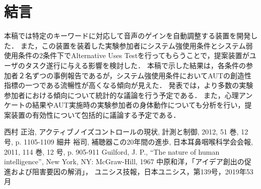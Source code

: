 \documentclass[a4paper]{jarticle}
\begin{document}
\section{結言}
本稿では特定のキーワードに対応して音声のゲインを自動調整する装置を開発した．
また，この装置を装着した実験参加者にシステム強使用条件とシステム弱使用条件の2条件下でAlternative Uses Testを行ってもらうことで，提案装置がユーザのタスク遂行に与える影響を検討した．
本稿で示した結果は，各条件の参加者２名ずつの事例報告であるが，システム強使用条件においてAUTの創造性指標の一つである流暢性が高くなる傾向が見えた．
発表では，より多数の実験参加者における傾向について統計的な議論を行う予定である．
また，心理アンケートの結果やAUT実施時の実験参加者の身体動作についても分析を行い，提案装置の有効性について包括的に議論する予定である．
%
%
\begin{thebibliography}{99}
西村 正治, アクティブノイズコントロールの現状, 計測と制御, 2012, 51 巻, 12 号, p. 1105-1109
細井 裕司, 補聴器この20年間の進歩, 日本耳鼻咽喉科学会会報, 2011, 114 巻, 12 号, p. 905-911
Guilford, J. P., “The nature of human intelligence”, New York, NY: McGraw-Hill,
1967
中原和洋，「アイデア創出の促進および阻害要因の解消」，
ユニシス技報，日本ユニシス，第139号，2019年53月
\end{thebibliography}
%
%
%
\end{document}
